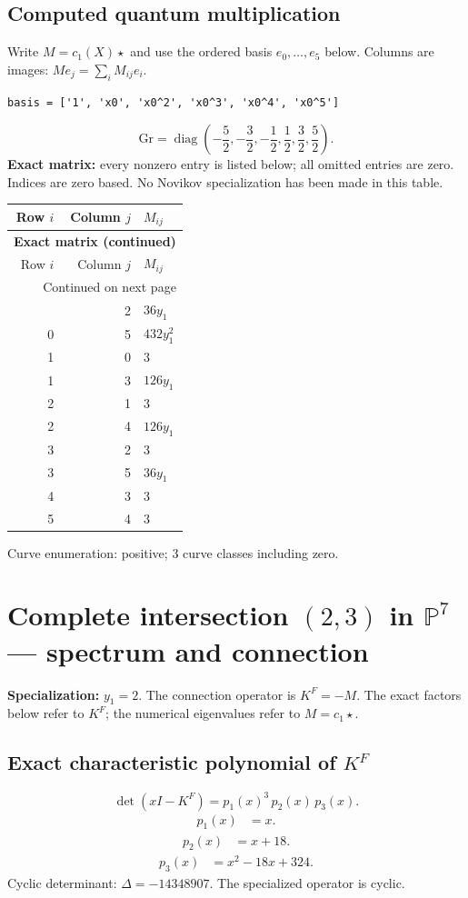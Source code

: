\documentclass[10pt,a4paper]{article}
\begin{document}
\subsection*{Computed quantum multiplication}
Write $M=c_1(X)\star$ and use the ordered basis $e_0,\ldots,e_{5}$ below. Columns are images: $M e_j=\sum_i M_{ij}e_i$.
\begin{lstlisting}
basis = ['1', 'x0', 'x0^2', 'x0^3', 'x0^4', 'x0^5']
\end{lstlisting}
\[\mathrm{Gr}=\operatorname{diag}\!\left(- \frac{5}{2},- \frac{3}{2},- \frac{1}{2},\frac{1}{2},\frac{3}{2},\frac{5}{2}\right).\]
\textbf{Exact matrix:} every nonzero entry is listed below; all omitted entries are zero. Indices are zero based. No Novikov specialization has been made in this table.
{\small\setlength{\tabcolsep}{7pt}\begin{longtable}{rrp{125mm}}
\toprule Row $i$ & Column $j$ & $M_{ij}$\\\midrule\endfirsthead
\multicolumn{3}{l}{\textbf{Exact matrix (continued)}}\\
\toprule Row $i$ & Column $j$ & $M_{ij}$\\\midrule\endhead
\midrule\multicolumn{3}{r}{Continued on next page}\\\endfoot\bottomrule\endlastfoot
0 & 2 & $36 y_{1}$\\
0 & 5 & $432 y_{1}^{2}$\\
1 & 0 & $3$\\
1 & 3 & $126 y_{1}$\\
2 & 1 & $3$\\
2 & 4 & $126 y_{1}$\\
3 & 2 & $3$\\
3 & 5 & $36 y_{1}$\\
4 & 3 & $3$\\
5 & 4 & $3$\\
\end{longtable}}
Curve enumeration: positive; 3 curve classes including zero.
\clearpage\section*{Complete intersection $(2,3)$ in $\mathbb P^{7}$ --- spectrum and connection}
\textbf{Specialization:} $y_1=2$. The connection operator is $K^F=-M$. The exact factors below refer to $K^F$; the numerical eigenvalues refer to $M=c_1\star$.
\subsection*{Exact characteristic polynomial of $K^F$}
\[\det(xI-K^F)=p_{1}(x)^{3}\,p_{2}(x)\,p_{3}(x).\]
\[\begin{aligned}p_{1}(x)&=x.\end{aligned}\]
\[\begin{aligned}p_{2}(x)&=x + 18.\end{aligned}\]
\[\begin{aligned}p_{3}(x)&=x^{2} - 18 x + 324.\end{aligned}\]
Cyclic determinant: $\Delta=-14348907$. The specialized operator is cyclic.
\end{document}
